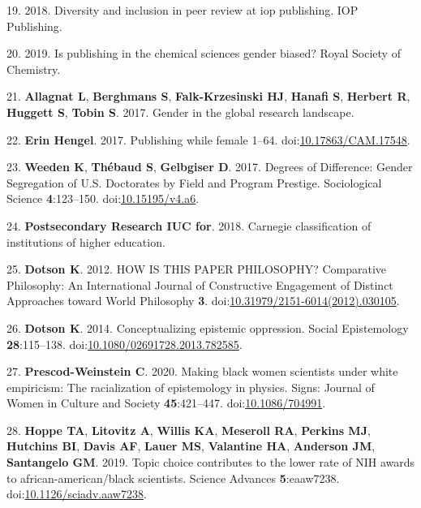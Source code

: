 \documentclass[11pt,]{article}
\begin{document}
\hypertarget{ref-Physics_2018}{}
19. 2018. Diversity and inclusion in peer review at iop publishing. IOP
Publishing.

\hypertarget{ref-RoyalChem_2019}{}
20. 2019. Is publishing in the chemical sciences gender biased? Royal
Society of Chemistry.

\hypertarget{ref-allagnat_gender_2017}{}
21. \textbf{Allagnat L}, \textbf{Berghmans S}, \textbf{Falk-Krzesinski
HJ}, \textbf{Hanafi S}, \textbf{Herbert R}, \textbf{Huggett S},
\textbf{Tobin S}. 2017. Gender in the global research landscape.

\hypertarget{ref-erin_hengel_publishing_2017}{}
22. \textbf{Erin Hengel}. 2017. Publishing while female 1--64.
doi:\href{https://doi.org/10.17863/CAM.17548}{10.17863/CAM.17548}.

\hypertarget{ref-weeden_degrees_2017}{}
23. \textbf{Weeden K}, \textbf{Thébaud S}, \textbf{Gelbgiser D}. 2017.
Degrees of Difference: Gender Segregation of U.S. Doctorates by Field
and Program Prestige. Sociological Science \textbf{4}:123--150.
doi:\href{https://doi.org/10.15195/v4.a6}{10.15195/v4.a6}.

\hypertarget{ref-Carnegie2018}{}
24. \textbf{Postsecondary Research IUC for}. 2018. Carnegie
classification of institutions of higher education.

\hypertarget{ref-Dotson2012}{}
25. \textbf{Dotson K}. 2012. HOW IS THIS PAPER PHILOSOPHY? Comparative
Philosophy: An International Journal of Constructive Engagement of
Distinct Approaches toward World Philosophy \textbf{3}.
doi:\href{https://doi.org/10.31979/2151-6014(2012).030105}{10.31979/2151-6014(2012).030105}.

\hypertarget{ref-Dotson2014}{}
26. \textbf{Dotson K}. 2014. Conceptualizing epistemic oppression.
Social Epistemology \textbf{28}:115--138.
doi:\href{https://doi.org/10.1080/02691728.2013.782585}{10.1080/02691728.2013.782585}.

\hypertarget{ref-PrescodWeinstein2020}{}
27. \textbf{Prescod-Weinstein C}. 2020. Making black women scientists
under white empiricism: The racialization of epistemology in physics.
Signs: Journal of Women in Culture and Society \textbf{45}:421--447.
doi:\href{https://doi.org/10.1086/704991}{10.1086/704991}.

\hypertarget{ref-Hoppe2019}{}
28. \textbf{Hoppe TA}, \textbf{Litovitz A}, \textbf{Willis KA},
\textbf{Meseroll RA}, \textbf{Perkins MJ}, \textbf{Hutchins BI},
\textbf{Davis AF}, \textbf{Lauer MS}, \textbf{Valantine HA},
\textbf{Anderson JM}, \textbf{Santangelo GM}. 2019. Topic choice
contributes to the lower rate of NIH awards to african-american/black
scientists. Science Advances \textbf{5}:eaaw7238.
doi:\href{https://doi.org/10.1126/sciadv.aaw7238}{10.1126/sciadv.aaw7238}.
\end{document}
